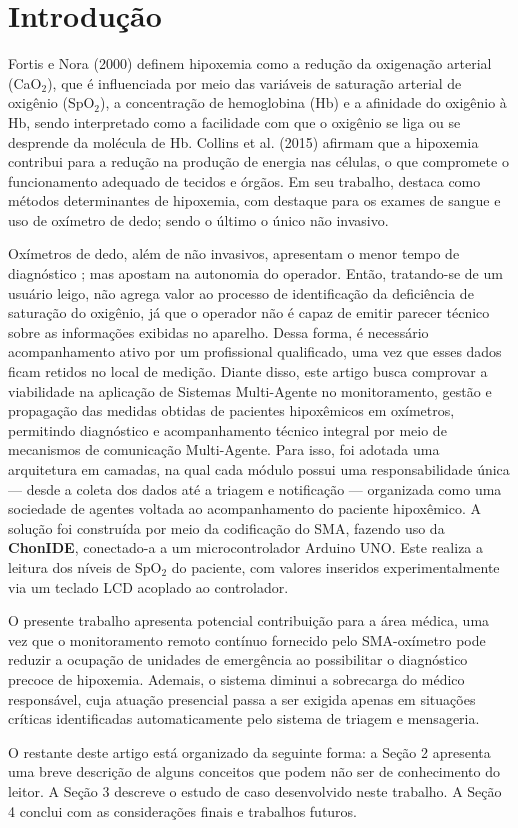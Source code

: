


\section{Introdução}\label{sec:introdução}
Fortis e Nora (2000) \cite{fortis2000hipoxemia} definem hipoxemia como a redução da oxigenação arterial (CaO$_2$), que é influenciada por meio das variáveis de saturação arterial de oxigênio (SpO$_2$), a concentração de hemoglobina (Hb) e a afinidade do oxigênio à Hb, sendo interpretado como a facilidade com que o oxigênio se liga ou se desprende da molécula de Hb. Collins et al. (2015) \cite{collins2015relating} afirmam que a hipoxemia contribui para a  redução na produção de energia nas células, o que compromete o funcionamento adequado de tecidos e órgãos. Em seu trabalho, destaca como métodos determinantes de hipoxemia, com destaque para os exames de sangue e uso de oxímetro de dedo; sendo o último o único não invasivo.

Oxímetros de dedo, além de não invasivos, apresentam o menor tempo de diagnóstico \cite{collins2015relating}; mas apostam na autonomia do operador. Então, tratando-se de um usuário leigo, não agrega valor ao processo de identificação da deficiência de saturação do oxigênio, já que o operador não é capaz de emitir parecer técnico sobre as informações exibidas no aparelho. Dessa forma, é necessário acompanhamento ativo por um profissional qualificado, uma vez que esses dados ficam retidos no local de medição. Diante disso, este artigo busca comprovar a viabilidade na aplicação de Sistemas Multi-Agente no monitoramento, gestão e propagação das medidas obtidas de pacientes hipoxêmicos em oxímetros, permitindo diagnóstico e acompanhamento técnico integral por meio de mecanismos de comunicação Multi-Agente. Para isso, foi adotada uma arquitetura em camadas, na qual cada módulo possui uma responsabilidade única — desde a coleta dos dados até a triagem e notificação — organizada como uma sociedade de agentes voltada ao acompanhamento do paciente hipoxêmico. A solução foi construída por meio da codificação do SMA, fazendo uso da \textbf{ChonIDE}, conectado-a a um microcontrolador Arduino UNO. Este realiza a leitura dos níveis de SpO$_2$ do paciente, com valores inseridos experimentalmente via um teclado LCD acoplado ao controlador.

O presente trabalho apresenta potencial contribuição para a área médica, uma vez que o monitoramento remoto contínuo fornecido pelo SMA-oxímetro pode reduzir a ocupação de unidades de emergência ao possibilitar o diagnóstico precoce de hipoxemia. Ademais, o sistema diminui a sobrecarga do médico responsável, cuja atuação presencial passa a ser exigida apenas em situações críticas identificadas automaticamente pelo sistema de triagem e mensageria.

O restante deste artigo está organizado da seguinte forma: a Seção 2 apresenta uma breve descrição de alguns conceitos que podem não ser de conhecimento do leitor. A Seção 3 descreve o estudo de caso desenvolvido neste trabalho. A Seção 4 conclui com as considerações finais e trabalhos futuros.